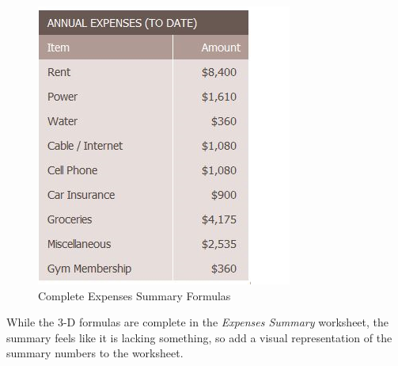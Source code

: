 \begin{figure}[H]
	\centering
	\includegraphics[width=\maxwidth{.95\linewidth}]{gfx/ch06_fig07}
	\caption{Complete Expenses Summary Formulas}
	\label{06:fig07}
\end{figure}

While the $ 3 $-D formulas are complete in the \textit{Expenses Summary} worksheet, the summary feels like it is lacking something, so add a visual representation of the summary numbers to the worksheet.

